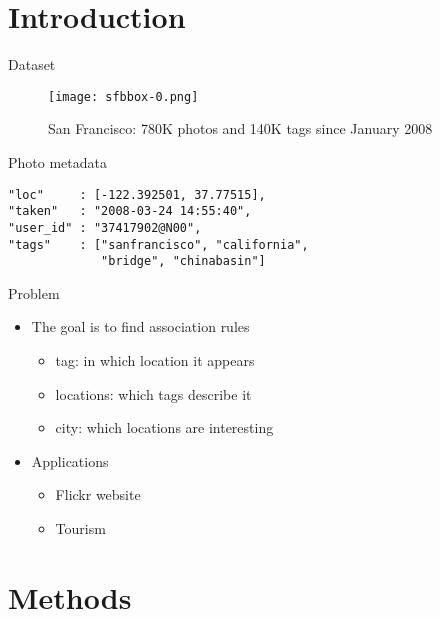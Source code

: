 \section{Introduction}\label{introduction}

\begin{frame}{Dataset}

\begin{figure} \texttt{[image: sfbbox-0.png]}
\caption{San Francisco: 780K photos and 140K tags since January 2008}
\end{figure}

\end{frame}

\begin{frame}[fragile]{Photo metadata}

\begin{verbatim}
"loc"     : [-122.392501, 37.77515],
"taken"   : "2008-03-24 14:55:40",
"user_id" : "37417902@N00",
"tags"    : ["sanfrancisco", "california",
             "bridge", "chinabasin"]
\end{verbatim}

\end{frame}

\begin{frame}{Problem}

\begin{itemize}
\itemsep1pt\parskip0pt
\item
  The goal is to find association rules

  \begin{itemize}
  \itemsep1pt\parskip0pt
  \item
    tag: in which location it appears
  \item
    locations: which tags describe it
  \item
    city: which locations are interesting
  \end{itemize}
\item
  Applications

  \begin{itemize}
  \itemsep1pt\parskip0pt
  \item
    Flickr website
  \item
    Tourism
  \end{itemize}
\end{itemize}

\end{frame}

\section{Methods}\label{methods}

